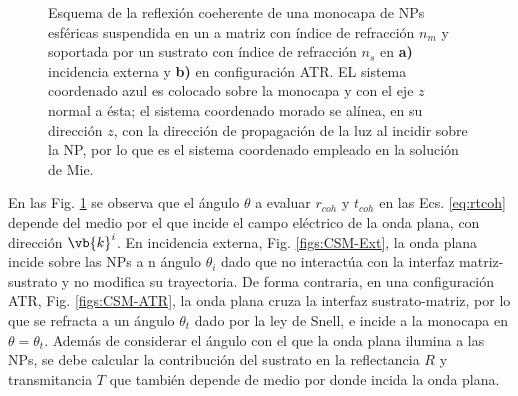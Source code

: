 \begin{figure}[h!]
\begin{subfigure}{.48\textwidth}
	\end{subfigure}
	\caption{Esquema de la reflexión coeherente de una monocapa de NPs esféricas  suspendida en un a matriz con índice de refracción $n_m$ y soportada por un sustrato con índice de refracción $n_s$ en \textbf{a)} incidencia externa  y \textbf{b)} en configuración ATR.  EL sistema coordenado azul es colocado sobre la monocapa y con el eje $z$ normal a ésta; el sistema coordenado morado se alínea,  en su dirección $z$, con la dirección de propagación de la luz al incidir sobre la NP, por lo que es el sistema coordenado empleado en la solución de Mie. }	\label{fig:CSM-Diagrams}	
	\end{figure}	

En las Fig. \ref{fig:CSM-Diagrams}	 se observa que el ángulo $\theta$ a evaluar $r_{coh}$ y $t_{coh}$ en las Ecs. \eqref{eq:rtcoh} depende del medio por el que incide el campo eléctrico de la onda plana, con dirección $\vb{k}^i$. En incidencia externa, Fig. \ref{figs:CSM-Ext}, la onda plana incide sobre las NPs a n ángulo $\theta_i$ dado que no interactúa con la interfaz matriz-sustrato y no modifica su trayectoria. De forma contraria, en una configuración ATR, Fig. \ref{figs:CSM-ATR}, la onda plana cruza la interfaz sustrato-matriz, por lo que se refracta a un ángulo $\theta_t$ dado por la ley de Snell, e incide a la monocapa en $\theta=\theta_t$. Además de considerar el ángulo con el que la onda plana ilumina a las NPs, se debe calcular la contribución del sustrato en la reflectancia $R$ y transmitancia $T$ que también depende de medio por donde incida la onda plana.

